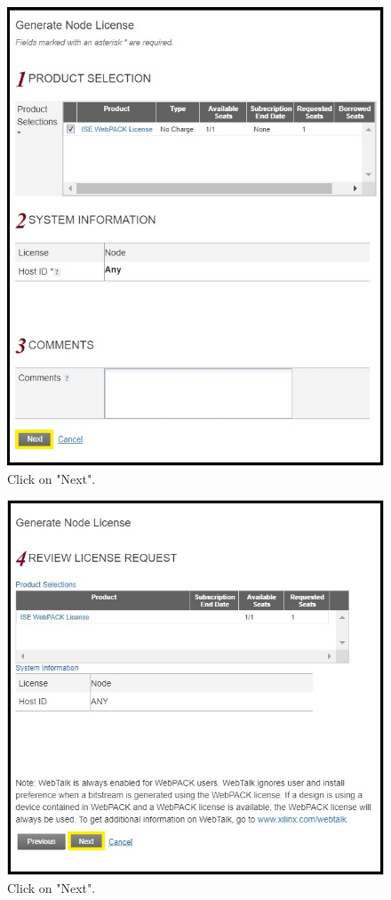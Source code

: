 \begin{figure}[H]
\centering
  \includegraphics[width=0.8\linewidth]{images/VivadoInstimg027.jpg}
  \captionsetup{width=0.8\linewidth}
  \caption{Click on "Next".}
  \label{fig:VivadoInstimg027}
\end{figure}

\begin{figure}[H]
\centering
  \includegraphics[width=0.8\linewidth]{images/VivadoInstimg028.jpg}
  \captionsetup{width=0.8\linewidth}
  \caption{Click on "Next".}
  \label{fig:VivadoInstimg028}
\end{figure}

